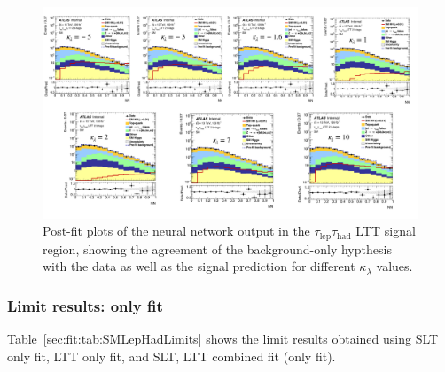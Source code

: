 \begin{figure}[htbp]
\begin{center}
\includegraphics[width=\textwidth]{DiHiggs/plots/kl_scan/bbtautauSubchannels/bkg_only_postfit_lephad_LTT.pdf}
\end{center}
\caption{Post-fit plots of the neural network output in the $\tau_{\text{lep}}\tau_{\text{had}}$ LTT signal region, 
showing the agreement of the background-only hypthesis with the data as well as the signal prediction for different $\kappa_\lambda$ values.}
\label{fig:postfit_ltt}
\end{figure}


\newpage
\subsubsection{Limit results: \texorpdfstring{\lephad}{lephad} only fit}


Table~\ref{sec:fit:tab:SMLepHadLimits} shows 
the limit results obtained using SLT only fit, LTT only fit, and SLT, LTT combined fit (\lephad only fit).


